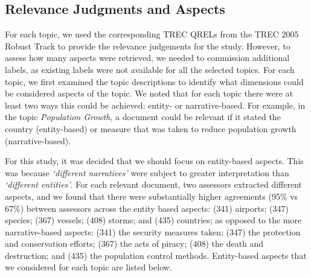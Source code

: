 \subsection{Relevance Judgments and Aspects}\label{sec:method:entities}
For each topic, we used the corresponding TREC QRELs from the TREC 2005 Robust Track to provide the relevance judgements for the study. However, to assess how many aspects were retrieved, we needed to commission additional labels, as existing labels were not available for all the selected topics. For each topic, we first examined the topic descriptions to identify what dimensions could be considered aspects of the topic. We noted that for each topic there were at least two ways this could be achieved: entity- or narrative-based. For example, in the topic \emph{Population Growth}, a document could be relevant if it stated the country (entity-based) or measure that was taken to reduce population growth (narrative-based).

For this study, it was decided that we should focus on entity-based aspects. This was because \emph{`different narratives'} were subject to greater interpretation than \emph{`different entities'}. For each relevant document, two assessors extracted different aspects, and we found that there were substantially higher agreements (95\% vs 67\%) between assessors across the entity based aspects: (341) airports; (347) species; (367) vessels; (408) storms; and (435) countries; as opposed to the more narrative-based aspects: (341) the security measures taken; (347) the protection and conservation efforts; (367) the acts of piracy; (408) the death and destruction; and (435) the population control methods. Entity-based aspects that we considered for each topic are listed below.

